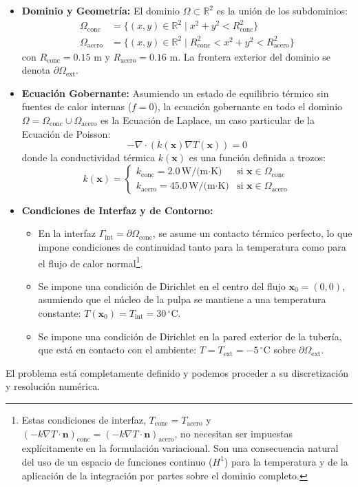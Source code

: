 \begin{itemize}
    \item \textbf{Dominio y Geometría:} El dominio \(\Omega \subset \mathbb{R}^2\) es la unión de los subdominios:
    \begin{align*}
        \Omega_{\text{conc}} &= \{ (x,y) \in \mathbb{R}^2 \mid x^2 + y^2 < R_{\text{conc}}^2 \} \\
        \Omega_{\text{acero}} &= \{ (x,y) \in \mathbb{R}^2 \mid R_{\text{conc}}^2 < x^2 + y^2 < R_{\text{acero}}^2 \}
    \end{align*}
    con \(R_{\text{conc}} = 0.15\) m y \(R_{\text{acero}} = 0.16\) m. La frontera exterior del dominio se denota \(\partial\Omega_{\text{ext}}\).
    
    \item \textbf{Ecuación Gobernante:} Asumiendo un estado de equilibrio térmico sin fuentes de calor internas (\(f=0\)), la ecuación gobernante en todo el dominio \(\Omega = \Omega_{\text{conc}} \cup \Omega_{\text{acero}}\) es la Ecuación de Laplace, un caso particular de la Ecuación de Poisson:
    \[ -\nabla \cdot (k(\bm{x}) \nabla T(\bm{x})) = 0 \]
    donde la conductividad térmica \(k(\bm{x})\) es una función definida a trozos:
    \[
    k(\bm{x}) = 
    \begin{cases} 
    k_{\text{conc}} = 2.0\,\text{W/(m·K)} & \text{si } \bm{x} \in \Omega_{\text{conc}} \\
    k_{\text{acero}} = 45.0\,\text{W/(m·K)} & \text{si } \bm{x} \in \Omega_{\text{acero}} 
    \end{cases}
    \]
    
    \item \textbf{Condiciones de Interfaz y de Contorno:}
    \begin{itemize}
        \item En la interfaz \(\Gamma_{\text{int}} = \partial\Omega_{\text{conc}}\), se asume un contacto térmico perfecto, lo que impone condiciones de continuidad tanto para la temperatura como para el flujo de calor normal\footnote{Estas condiciones de interfaz, \(T_{\text{conc}} = T_{\text{acero}}\) y \(\left(-k \nabla T \cdot \bm{n}\right)_{\text{conc}} = \left(-k \nabla T \cdot \bm{n}\right)_{\text{acero}}\), no necesitan ser impuestas explícitamente en la formulación variacional. Son una consecuencia natural del uso de un espacio de funciones continuo (\(H^1\)) para la temperatura y de la aplicación de la integración por partes sobre el dominio completo.}.
        \item Se impone una condición de Dirichlet en el centro del flujo \(\bm{x}_0=(0,0)\), asumiendo que el núcleo de la pulpa se mantiene a una temperatura constante: \(T(\bm{x}_0) = T_{\text{int}} = 30 \, ^\circ\text{C}\).
        \item Se impone una condición de Dirichlet en la pared exterior de la tubería, que está en contacto con el ambiente: \(T = T_{\text{ext}} = -5 \, ^\circ\text{C}\) sobre \(\partial\Omega_{\text{ext}}\).
    \end{itemize}
\end{itemize}
El problema está completamente definido y podemos proceder a su discretización y resolución numérica.

